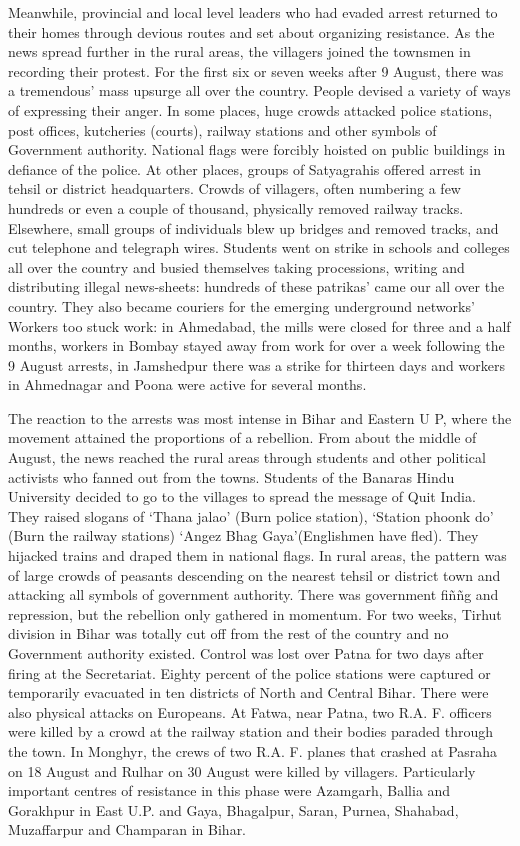 Meanwhile, provincial and local level leaders who had evaded arrest returned to their homes through devious routes and set about organizing resistance. As the news spread further in the rural areas, the villagers joined the townsmen in recording their protest. For the first six or seven weeks after 9 August, there was a tremendous' mass upsurge all over the country. People devised a variety of ways of expressing their anger. In some places, huge crowds attacked police stations, post offices, kutcheries (courts), railway stations and other symbols of Government authority. National flags were forcibly hoisted on public buildings in defiance of the police. At other places, groups of Satyagrahis offered arrest in tehsil or district headquarters. Crowds of villagers, often numbering a few hundreds or even a couple of thousand, physically removed railway tracks. Elsewhere, small groups of individuals blew up bridges and removed tracks, and cut telephone and telegraph wires. Students went on strike in schools and colleges all over the country and busied themselves taking processions, writing and distributing illegal news-sheets: hundreds of these patrikas' came our all over the country. They also became couriers for the emerging underground networks' Workers too stuck work: in Ahmedabad, the mills were closed for three and a half months, workers in Bombay stayed away from work for over a week following the 9 August arrests, in Jamshedpur there was a strike for thirteen days and workers in Ahmednagar and Poona were active for several months.

The reaction to the arrests was most intense in Bihar and Eastern U P, where the movement attained the proportions of a rebellion. From about the middle of August, the news reached the rural areas through students and other political activists who fanned out from the towns. Students of the Banaras Hindu University decided to go to the villages to spread the message of Quit India. They raised slogans of `Thana jalao' (Burn police station), `Station phoonk do' (Burn the railway stations) `Angez Bhag Gaya'(Englishmen have fled). They hijacked trains and draped them in national flags. In rural areas, the pattern was of large crowds of peasants descending on the nearest tehsil or district town and attacking all symbols of government authority. There was government fiññg and repression, but the rebellion only gathered in momentum. For two weeks, Tirhut division in Bihar was totally cut off from the rest of the country and no Government authority existed. Control was lost over Patna for two days after firing at the Secretariat. Eighty percent of the police stations were captured or temporarily evacuated in ten districts of North and Central Bihar. There were also physical attacks on Europeans. At Fatwa, near Patna, two R.A. F. officers were killed by a crowd at the railway station and their bodies paraded through the town. In Monghyr, the crews of two R.A. F. planes that crashed at Pasraha on 18 August and Rulhar on 30 August were killed by villagers. Particularly important centres of resistance in this phase were Azamgarh, Ballia and Gorakhpur in East U.P. and Gaya, Bhagalpur, Saran, Purnea, Shahabad, Muzaffarpur and Champaran in Bihar.

